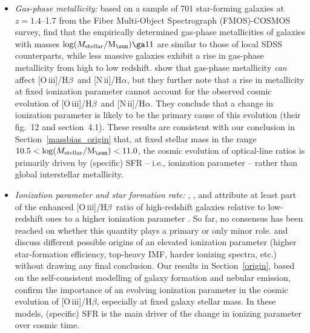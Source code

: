 \documentclass[fleqn,usenatbib]{mnras}
\newcommand{\Msun}{\hbox{M$_\sun$}}
\newcommand{\oiiihb}{\hbox{[O\,{\sc iii}]/H$\beta$}}
\newcommand{\niiha}{\hbox{[N\,{\sc ii}]/H$\alpha$}}
\begin{document}
\begin{itemize}
\item{\it Gas-phase metallicity:}
based on a sample of 701 star-forming galaxies at $z=1.4$--1.7 from  
the Fiber Multi-Object Spectrograph (FMOS)-COSMOS survey,
\citet{Kashino17} find that the empirically determined gas-phase
metallicities of galaxies with masses $\log(M_{\rm
  stellar}/\Msun)\ga11$ are similar to those of local SDSS
counterparts, while less massive galaxies exhibit a rise in gas-phase
metallicity from high to low redshift.  \citet{Kashino17} show
that gas-phase metallicity {\em can} affect \oiiihb\ and 
\niiha, but they further note that a rise in metallicity at
fixed ionization parameter cannot account for the observed cosmic
evolution of \oiiihb\ and \niiha. They conclude that a change in
ionization parameter is likely to be the primary  cause of this
evolution (their fig.~12 and section~4.1). These results are
consistent with our conclusion in Section~\ref{massbias_origin} that,
at fixed stellar mass in the range $10.5<\log (M_{\rm
  stellar}/\Msun)<11.0$, the cosmic evolution  of optical-line ratios
is primarily driven by  (specific) SFR -- i.e., ionization  parameter
-- rather than global interstellar metallicity.  

\item{\it Ionization parameter and star formation rate:}
\citet{Brinchmann08}, \citet[from the analysis of 251 star-forming
galaxies at $z \sim 2.3$ with the Keck/MOSFIRE
spectrometer]{Steidel14}, \citet[from the analysis of 118 star-foming
galaxies at $z\sim1.5$ with the Subaru Fiber Multi Object
Spectrograph]{Hayashi15} and  \citet[see above]{Kashino17} attribute
at least part of the enhanced \oiiihb\  ratio of high-redshift
galaxies relative to low-redshift ones to a higher  ionization
parameter \citep[see also,][]{Cullen16}. So far, no consensus has been
reached on whether  this 
quantity plays a primary \citep{Kashino17} or only minor
\citep{Steidel14} role. \citet{Hayashi15} and  \citet{Kashino17}
discuss different possible origins of an elevated ionization parameter
(higher star-formation efficiency, top-heavy IMF, harder ionizing
spectra, etc.)  without drawing any final conclusion. Our results in
Section~\ref{origin},  based on the self-consistent modelling of
galaxy formation and nebular  emission, confirm the importance of an
evolving ionization parameter in the cosmic evolution of \oiiihb,
especially at fixed galaxy stellar mass. In these models, (specific)
SFR is the main driver of the change in ionizing parameter over cosmic
time. 


\end{itemize}
\end{document}
